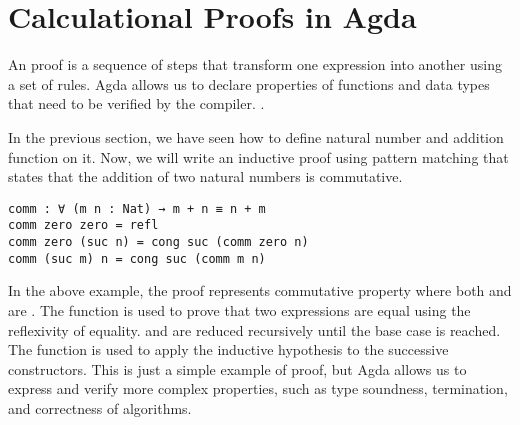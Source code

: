 \section{Calculational Proofs in Agda}
An proof is a sequence of steps that transform one expression into another using
a set of rules. Agda allows us to declare properties of functions and data types
that need to be verified by the compiler. \cite{kidney2020finiteness}.  

In the previous section, we have seen how to define natural number and addition
function on it. Now, we will write an inductive proof using pattern matching
that states that the addition of two natural numbers is commutative.

\begin{verbatim}
comm : ∀ (m n : Nat) → m + n ≡ n + m
comm zero zero = refl
comm zero (suc n) = cong suc (comm zero n)
comm (suc m) n = cong suc (comm m n)
\end{verbatim}

In the above example, the proof  represents commutative
property where both  and  are . The
 function is used to prove that two expressions are equal using the
reflexivity of equality.  and  are
reduced recursively until the base case is reached. The  function
is used to apply the inductive hypothesis to the successive 
constructors. This is just a simple example of proof, but Agda allows us to
express and verify more complex properties, such as type soundness, termination,
and correctness of algorithms.

